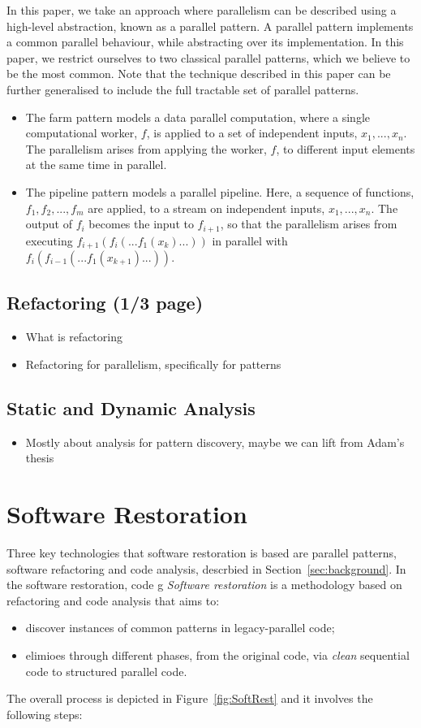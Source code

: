 In this paper, we take an approach where parallelism can be described using a high-level abstraction, known as a parallel pattern. A parallel pattern implements a common parallel behaviour, while abstracting over its implementation. 
In this paper, we restrict ourselves to two classical parallel patterns, which we believe to be the most common. Note that the technique described in this paper can be further generalised to include the full tractable set of parallel patterns.
\begin{itemize}
    \item The farm pattern models a data parallel computation, where a single computational worker, $f$, is applied to a set of independent inputs, $x_{1}, ..., x_{n}$. The parallelism arises from applying the worker, $f$, to different input elements at the same time in parallel. 
    \item The pipeline pattern models a parallel pipeline. Here, a sequence of functions, $f_{1}, f_{2}, ..., f_{m}$ are applied, to a stream on independent inputs, $x_{1}, ..., x_{n}$. The output of $f_{i}$ becomes the input to $f_{i+1}$, so that the parallelism arises from executing $f_{i+1}(f_{i}(...f_{1}(x_{k})...))$ in parallel with $f_{i}(f_{i-1}(...f_{1}(x_{k+1})...))$.
\end{itemize}
\subsection{Refactoring (1/3 page)}
\begin{itemize}
\item What is refactoring
\item Refactoring for parallelism, specifically for patterns
\end{itemize}

\subsection{Static and Dynamic Analysis}
\begin{itemize}
\item Mostly about analysis for pattern discovery, maybe we can lift from Adam's thesis
\end{itemize}

\section{Software Restoration}
Three key technologies that software restoration is based are parallel patterns, software refactoring and code analysis, descrbied in Section~\ref{sec:background}. In the software restoration, code g\noindent
\emph{Software restoration} is a methodology based on refactoring and code analysis that aims to:
\begin{itemize}
\item discover instances of common patterns in legacy-parallel code;
\item elimioes through different phases, from the original code, via \emph{clean} sequential code to structured parallel code.
\end{itemize}
  The overall process is depicted in Figure~\ref{fig:SoftRest} and it involves the following steps: 

